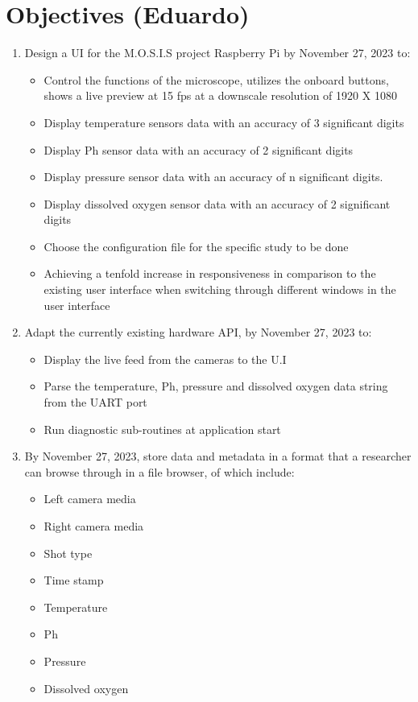 \section{Objectives (Eduardo)}
\begin{enumerate}
    \item Design a UI for the M.O.S.I.S project Raspberry Pi by November 27, 2023 to:
    \begin{itemize}
        \item Control the functions of the microscope, utilizes the onboard buttons, shows a live preview at 15 fps at a downscale resolution of 1920 X 1080
        \item Display temperature sensors data with an accuracy of 3 significant digits
        \item Display Ph sensor data with an accuracy of 2 significant digits
        \item Display pressure sensor data with an accuracy of n significant digits.
        \item Display dissolved oxygen sensor data with an accuracy of 2 significant digits
        \item Choose the configuration file for the specific study to be done
        \item Achieving a tenfold increase in responsiveness in comparison to the existing user interface when switching through different windows in the user interface
    \end{itemize} 
    \item Adapt the currently existing hardware API, by November 27, 2023 to:
    \begin{itemize}
        \item Display the live feed from the cameras to the U.I 
        \item Parse the temperature, Ph, pressure and dissolved oxygen data string from the UART port
        \item Run diagnostic sub-routines at application start
    \end{itemize}
    \item By November 27, 2023, store data and metadata in a format that a researcher can browse through in a file browser, of which include:
    \begin{itemize}
        \item Left camera media
        \item Right camera media
        \item Shot type
        \item Time stamp
        \item Temperature
        \item Ph
        \item Pressure
        \item Dissolved oxygen
    \end{itemize}
\end{enumerate}